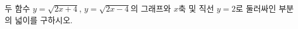 \hspace*{2mm}\begin{minipage}[t]{\dimexpr\linewidth-2mm\relax}\vspace{0pt}
두 함수 $y=\sqrt{2x+4}$, $y=\sqrt{2x-4}$의 그래프와 $x$축 및 직선 $y=2$로 둘러싸인 부분의 넓이를 구하시오.\end{minipage}
